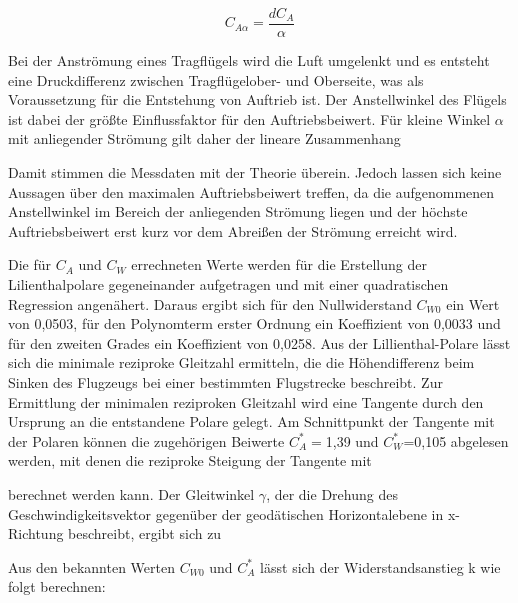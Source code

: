 \begin{equation}
C_{A\alpha}=\frac{dC_A}{\alpha}
\end{equation}

	
Bei der Anströmung eines Tragflügels wird die Luft umgelenkt und es entsteht eine Druckdifferenz zwischen Tragflügelober- und Oberseite, was als Voraussetzung für die Entstehung von Auftrieb ist. Der Anstellwinkel des Flügels ist dabei der größte Einflussfaktor für den Auftriebsbeiwert. Für kleine Winkel $\alpha$ mit anliegender Strömung gilt daher der lineare Zusammenhang


Damit stimmen die Messdaten mit der Theorie überein. Jedoch lassen sich keine Aussagen über den maximalen Auftriebsbeiwert treffen, da die aufgenommenen Anstellwinkel im Bereich der anliegenden Strömung liegen und der höchste Auftriebsbeiwert erst kurz vor dem Abreißen der Strömung erreicht wird. 

Die für $C_A$ und $C_W$ errechneten Werte werden für die Erstellung der Lilienthalpolare gegeneinander aufgetragen und mit einer quadratischen Regression angenähert. Daraus ergibt sich für den Nullwiderstand $C_{W0}$ ein Wert von 0,0503, für den Polynomterm erster Ordnung ein Koeffizient von 0,0033 und für den zweiten Grades ein Koeffizient von 0,0258. 
Aus der Lillienthal-Polare lässt sich die minimale reziproke Gleitzahl ermitteln, die die Höhendifferenz beim Sinken des Flugzeugs bei einer bestimmten Flugstrecke beschreibt. Zur Ermittlung der minimalen reziproken Gleitzahl wird eine Tangente durch den Ursprung an die entstandene Polare gelegt. Am Schnittpunkt der Tangente mit der Polaren können die zugehörigen Beiwerte $C_A^*=$1,39 und  $C_W^*$=0,105 abgelesen werden, mit denen die reziproke Steigung der Tangente mit


berechnet werden kann. Der Gleitwinkel $\gamma$, der die Drehung des Geschwindigkeitsvektor gegenüber der geodätischen Horizontalebene in x-Richtung beschreibt, ergibt sich zu


Aus den bekannten Werten $C_{W0}$ und $C^{*}_A$ lässt sich der Widerstandsanstieg k wie folgt berechnen: 

